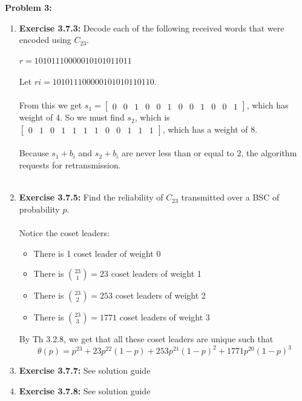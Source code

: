 \documentclass[11pt]{article}
\newenvironment{problem}[1]{\textbf{Problem #1: }}{\newpage}
\begin{document}
	\begin{problem}{3}
		\begin{enumerate}[label = (\alph*)]
			\item \textbf{Exercise 3.7.3:} Decode each of the following received words that were encoded using $C_{23}$.
			\\ \\
			$r = 1010 1110 0000 1010 1011 011$
			\\ \\
			Let $ri = 1010 1110 0000 1010 1011 0110$.
			\\ \\
			From this we get $s_1 =  \left[ \begin {array}{cccccccccccc} 0&0&1&0&0&1&0&0&1&0&0&1
			\end {array} \right]$, which has weight of 4.  So we must find $s_2$, which is $ \left[ \begin {array}{cccccccccccc} 0&1&0&1&1&1&1&0&0&1&1&1
			\end {array} \right]$, which has a weight of 8. 
			\\ \\
			Because $s_1 + b_i$ and $s_2 + b_i$ are never less than or equal to 2, the algorithm requests for retransmission.
			\\ \\
			\item \textbf{Exercise 3.7.5:} Find the reliability of $C_{23}$ transmitted over a BSC of probability $p$.
			\\ \\
			Notice the coset leaders:
			\begin{itemize}
				\item There is 1 coset leader of weight 0 
				\item There is $\binom{23}{1} = 23$ coset leaders of weight 1
				\item There is $\binom{23}{2} = 253$ coset leaders of weight 2
				\item There is $\binom{23}{3} = 1771$ coset leaders of weight 3
			\end{itemize}
			By Th 3.2.8, we get that all these coset leaders are unique such that
			\[\theta(p) = p^{23} + 23p^{22}(1-p) + 253p^{21}(1-p)^2 + 1771p^{20}(1-p)^3\]
			\item \textbf{Exercise 3.7.7:} See solution guide
			\item \textbf{Exercise 3.7.8:} See solution guide
		\end{enumerate}
	\end{problem}
\end{document}
